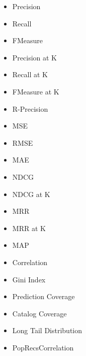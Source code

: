 \documentclass[11pt]{article}
\begin{document}
\begin{itemize}
    \item Precision

    \item Recall

    \item FMeasure

    \item Precision at K

    \item Recall at K

    \item FMeasure at K

    \item R-Precision

    \item MSE

    \item RMSE

    \item MAE

    \item NDCG

    \item NDCG at K

    \item MRR

    \item MRR at K

    \item MAP


    \item Correlation

    \item Gini Index

    \item Prediction Coverage

    \item Catalog Coverage


    \item Long Tail Distribution


    \item  PopRecsCorrelation
\end{itemize}




\hfill\break
\hfill\break



\end{document}
